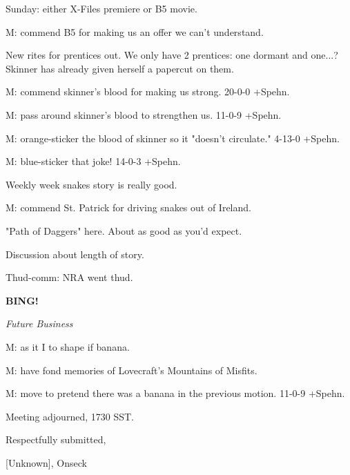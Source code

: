 \documentclass[12pt]{article}
\newcommand{\bing}{{\bf BING!} }
\newcommand{\goto}[1]{\bing \vskip 12pt \centerline{{\em{#1}}}}
\begin{document}
Sunday: either X-Files premiere or B5 movie.

M: commend B5 for making us an offer we can't understand.

New rites for prentices out. We only have 2 prentices: one dormant and one...? Skinner has already given herself a papercut on them.

M: commend skinner's blood for making us strong. 20-0-0 +Spehn.

M: pass around skinner's blood to strengthen us. 11-0-9 +Spehn.

M: orange-sticker the blood of skinner so it "doesn't circulate." 4-13-0 +Spehn.

M: blue-sticker that joke! 14-0-3 +Spehn.

Weekly week snakes story is really good.

M: commend St. Patrick for driving snakes out of Ireland.

"Path of Daggers" here. About as good as you'd expect.

Discussion about length of story.

Thud-comm: NRA went thud.

\goto{Future Business}

M: as it I to shape if banana.

M: have fond memories of Lovecraft's Mountains of Misfits.

M: move to pretend there was a banana in the previous motion. 11-0-9 +Spehn.

\vspace{12pt}

\noindent
Meeting adjourned, 1730 SST.

\vspace{18pt}

\centerline{Respectfully submitted,}
\centerline{[Unknown], Onseck}
\end{document}
